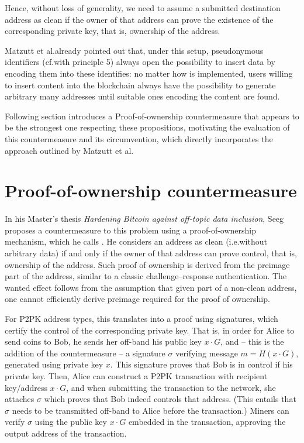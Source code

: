 \documentclass[a4paper,11pt,titlepage]{scrbook}
\begin{document}
Hence, without loss of generality, we need to assume a submitted destination address as clean if the owner of that address can prove the existence of the corresponding private key, that is, ownership of the address.

Matzutt et al.\@ already pointed out that, under this setup, pseudonymous identifiers (cf.\@ with principle 5) always open the possibility to insert data by encoding them into these identifies: no matter how  is implemented, users willing to insert content into the blockchain always have the possibility to generate arbitrary many addresses until suitable ones encoding the content are found. \cite[sec.~III.C]{matzutt_thwarting_2018}

Following section introduces a Proof-of-ownership countermeasure that appears to be the strongest one respecting these propositions, motivating the evaluation of this countermeasure and its circumvention, which directly incorporates the approach outlined by Matzutt et al.


\section{Proof-of-ownership countermeasure}

In his Master's thesis \emph{Hardening Bitcoin against off-topic data inclusion}, Seeg proposes a countermeasure to this problem using a proof-of-ownership mechanism, which he calls . \cite{seeg_hardening_2018}
%
He considers an address as clean (i.e.\@ without arbitrary data) if and only if the owner of that address can prove control, that is, ownership of the address.
Such proof of ownership is derived from the  preimage part of the address, similar to a classic challenge–response authentication.
The wanted effect follows from the assumption that given  part of a non-clean address, one cannot efficiently derive  preimage required for the proof of ownership.

For P2PK address types, this translates into a proof using signatures, which certify the control of the corresponding private key.
That is, in order for Alice to send coins to Bob, he sends her off-band his public key $x\cdot G$, and – this is the addition of the countermeasure – a signature $\sigma$ verifying message $m=H(x\cdot G)$, generated using private key $x$.
This signature proves that Bob is in control if his private key.
Then, Alice can construct a P2PK transaction with recipient key/address $x\cdot G$, and when submitting the transaction to the network, she attaches $\sigma$ which proves that Bob indeed controls that address. 
(This entails that $\sigma$ needs to be transmitted off-band to Alice before the transaction.)
Miners can verify $\sigma$ using the public key $x\cdot G$ embedded in the transaction, approving the output address of the transaction.
\end{document}
